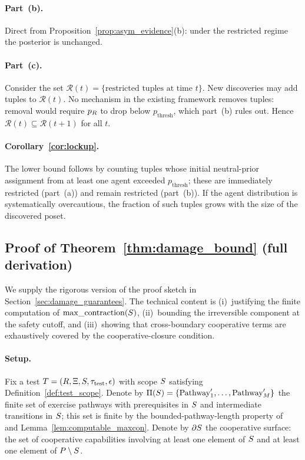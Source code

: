 \paragraph{Part~(b).}
Direct from Proposition~\ref{prop:asym_evidence}(b): under the
restricted regime the posterior is unchanged.

\paragraph{Part~(c).}
Consider the set
$\mathcal{R}(t) = \{\text{restricted tuples at time } t\}$.
New discoveries may add tuples to $\mathcal{R}(t)$.  No
mechanism in the existing framework removes tuples: removal
would require $p_R$ to drop below $p_{\mathrm{thresh}}$, which
part~(b) rules out.  Hence
$\mathcal{R}(t) \subseteq \mathcal{R}(t+1)$ for all $t$.

\paragraph{Corollary~\ref{cor:lockup}.}
The lower bound follows by counting tuples whose initial
neutral-prior assignment from at least one agent exceeded
$p_{\mathrm{thresh}}$; these are immediately restricted
(part~(a)) and remain restricted (part~(b)).  If the agent
distribution is systematically overcautious, the fraction of
such tuples grows with the size of the discovered poset.

\subsection{Proof of Theorem~\ref{thm:damage_bound}
(full derivation)}
\label{app:proof_damage_bound}

We supply the rigorous version of the proof sketch in
Section~\ref{sec:damage_guarantees}.  The technical content is
(i)~justifying the finite computation of $\mathrm{max\_contraction}(S)$,
(ii)~bounding the irreversible component at the safety cutoff,
and (iii)~showing that cross-boundary cooperative terms are
exhaustively covered by the cooperative-closure condition.

\paragraph{Setup.}
Fix a test
$T = (R, \Xi, S, \tau_{\mathrm{test}}, \epsilon)$ with
scope $S$ satisfying Definition~\ref{def:test_scope}.
Denote by $\Pi(S) = \{\mathrm{Pathway}'_1, \ldots,
\mathrm{Pathway}'_M\}$ the finite set of exercise pathways with
prerequisites in $S$ and intermediate transitions in
$S$; this set is finite by the bounded-pathway-length
property of~\citep[Definition~2]{lasser2026horizon} and
Lemma~\ref{lem:computable_maxcon}.  Denote by
$\partial S$ the cooperative surface: the set of
cooperative capabilities involving at least one element of
$S$ and at least one element of $P \setminus S$.

